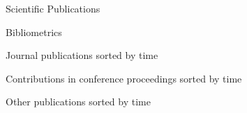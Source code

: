 \documentclass{resume} %
\begin{document}
    \begin{rSection}{Scientific Publications}


        \begin{rNoListSubsection}{Bibliometrics}{}{}{}
            
        \end{rNoListSubsection}

        \newpage


        \setlength{} %

        \begin{rNoListSubsection}{Journal publications sorted by time}{}{}{}
            \nocite{*}
            \printbibliography[type=article,heading=none,omitnumbers=true]{}
        \end{rNoListSubsection}


        \begin{rNoListSubsection}{Contributions in conference proceedings sorted by time}{}{}{}
            \nocite{*}
            \printbibliography[filter=conferences,heading=none,omitnumbers=true]{}
        \end{rNoListSubsection}


        \begin{rNoListSubsection}{Other publications sorted by time}{}{}{}
            \nocite{*}
            \printbibliography[filter=other,heading=none,omitnumbers=true]{}
        \end{rNoListSubsection}

    \end{rSection}
\end{document}
